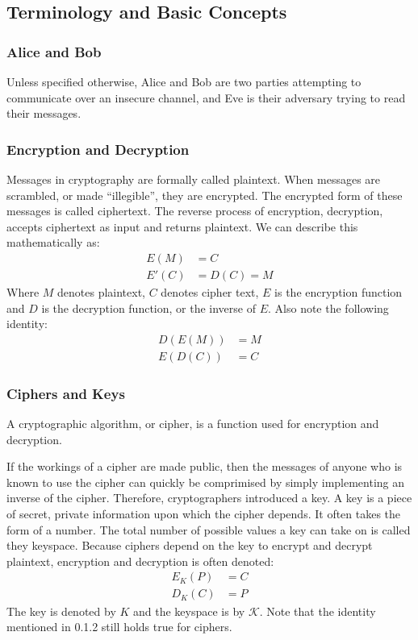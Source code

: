 \documentclass[12pt, a4paper, draft]{report}
\begin{document}
\subsection{Terminology and Basic Concepts}

\subsubsection{Alice and Bob}
Unless specified otherwise, Alice and Bob are two parties attempting to
communicate over an insecure channel, and Eve is their adversary trying to
read their messages.

\subsubsection{Encryption and Decryption}

Messages in cryptography are formally called plaintext. When messages are
scrambled, or made ``illegible'', they are encrypted. The encrypted form
of these messages is called ciphertext. The reverse process of encryption,
decryption, accepts ciphertext as input and returns plaintext. We can
describe this mathematically as:
\begin{align*}
    E(M) & = C\\
    E'(C) & = D(C) = M
\end{align*}
Where $M$ denotes plaintext, $C$ denotes cipher text, $E$ is the encryption
function and $D$ is the decryption function, or the inverse of $E$. Also
note the following identity:
\begin{align*}
    D(E(M)) & = M\\
    E(D(C)) & = C
\end{align*}

\subsubsection{Ciphers and Keys}

A cryptographic algorithm, or cipher, is a function used for encryption
and decryption.

If the workings of a cipher are made public, then the messages
of anyone who is known to use the cipher can quickly be comprimised
by simply implementing an inverse of the cipher. Therefore, cryptographers
introduced a key. A key is a piece of secret, private information
upon which the cipher depends. It often takes the form of a number.
The total number of possible values a key can take on is called they
keyspace. Because ciphers depend on the key to encrypt and decrypt
plaintext, encryption and decryption is often denoted:
\begin{align*}
    E_K(P) & = C\\
    D_K(C) & = P
\end{align*}
The key is denoted by $K$ and the keyspace is by $\mathcal{K}$. Note that
the identity mentioned in 0.1.2 still holds true for ciphers.
\end{document}
